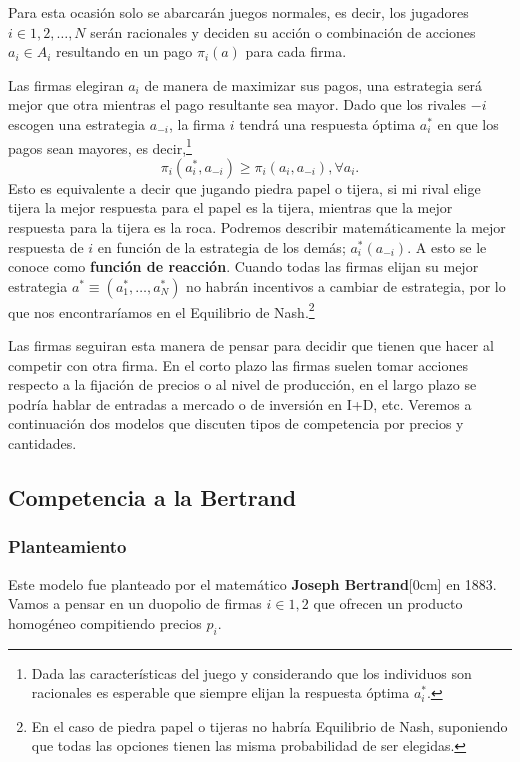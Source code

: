Para esta ocasión solo se abarcarán juegos normales, es decir, los jugadores $i \in 1,2,\ldots,N$ serán racionales y deciden su acción o combinación de acciones $a_i \in A_i$ resultando en un pago $\pi_i(a)$ para cada firma.

Las firmas elegiran $a_i$ de manera de maximizar sus pagos, una estrategia será mejor que otra mientras el pago resultante sea mayor. Dado que los rivales $-i$ escogen una estrategia $a_{-i}$, la firma $i$ tendrá una respuesta óptima $a_i^*$ en que los pagos sean mayores, es decir,\footnote{Dada las características del juego y considerando que los individuos son racionales es esperable que siempre elijan la respuesta óptima $a_i^*$.} 
\begin{equation}
    \pi_i(a_i^*, a_{-i}) \geq \pi_i(a_i, a_{-i}), \forall a_i . \label{eq: mejor respuesta}
\end{equation}
Esto es equivalente a decir que jugando piedra papel o tijera, si mi rival elige tijera la mejor respuesta para el papel es la tijera, mientras que la mejor respuesta para la tijera es la roca. Podremos describir matemáticamente la mejor respuesta de $i$ en función de la estrategia de los demás; $a^*_i(a_{-i})$. A esto se le conoce como \textbf{función de reacción}. Cuando todas las firmas elijan su mejor estrategia $a^* \equiv (a_1^*,\ldots,a_N^*)$ no habrán incentivos a cambiar de estrategia, por lo que nos encontraríamos en el Equilibrio de Nash.\footnote{En el caso de piedra papel o tijeras no habría Equilibrio de Nash, suponiendo que todas las opciones tienen las misma probabilidad de ser elegidas.} 

Las firmas seguiran esta manera de pensar para decidir que tienen que hacer al competir con otra firma. En el corto plazo las firmas suelen tomar acciones respecto a la fijación de precios o al nivel de producción, en el largo plazo se podría hablar de entradas a mercado o de inversión en I+D, etc. Veremos a continuación dos modelos que discuten tipos de competencia por precios y cantidades.

\subsection{Competencia a la Bertrand}

\subsubsection{Planteamiento}
Este modelo fue planteado por el matemático \textbf{Joseph Bertrand}[0cm] en 1883. Vamos a pensar en un duopolio de firmas $i\in 1,2$ que ofrecen un producto homogéneo compitiendo precios $p_i$. 

